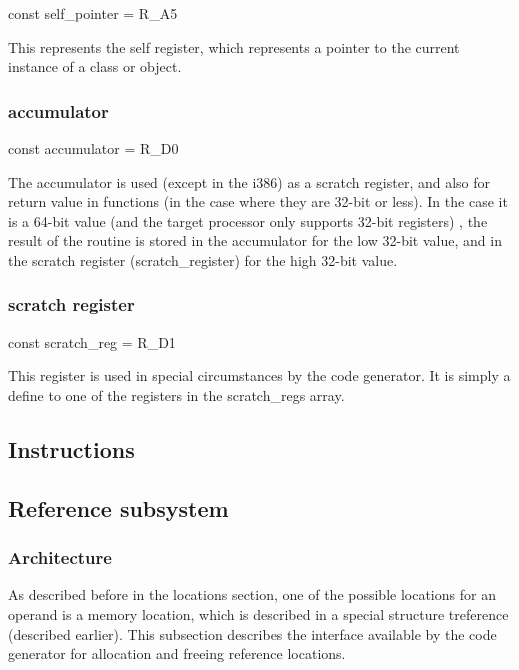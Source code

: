\documentclass [12pt]{article}
\begin{document}
\textsf{const self{\_}pointer = R{\_}A5}

This represents the self register, which represents a pointer to the current 
instance of a class or object.

\subsubsection{accumulator}
\label{subsubsec:accumulatorents}

\textsf{const accumulator = R{\_}D0}

The accumulator is used (except in the i386) as a scratch register, and also 
for return value in functions (in the case where they are 32-bit or less). 
In the case it is a 64-bit value (and the target processor only supports 
32-bit registers) , the result of the routine is stored in the accumulator 
for the low 32-bit value, and in the scratch register 
(\textsf{scratch{\_}register}) for the high 32-bit value.

\subsubsection{scratch register}
\label{subsubsec:mylabel27}

\textsf{const scratch{\_}reg = R{\_}D1}

This register is used in special circumstances by the code generator. It is 
simply a define to one of the registers in the \textsf{scratch{\_}regs 
}array.

\subsection{Instructions}
\label{subsec:instructionsr}

\subsection{Reference subsystem}
\label{subsec:reference}

\subsubsection{Architecture}
\label{subsubsec:architecturebsysteme}

As described before in the locations section, one of the possible locations 
for an operand is a memory location, which is described in a special 
structure \textsf{treference} (described earlier). This subsection describes 
the interface available by the code generator for allocation and freeing 
reference locations.
\end{document}
